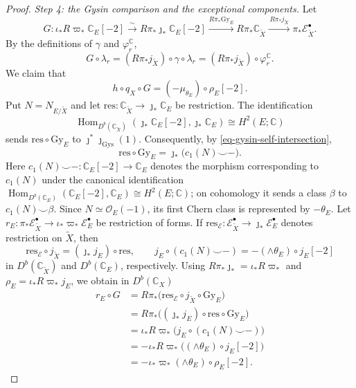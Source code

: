 \documentclass[11pt]{amsart}
\numberwithin{equation}{section}
\theoremstyle{plain}
\theoremstyle{definition}
\begin{document}
\begin{proof}
\smallskip
{}\label{step-generalized-bc-4}
\noindent\emph{Step 4: the Gysin comparison and the exceptional components.}
Let
\[
G:\iota_*R\varpi_*\mathbb C_E[-2]
\xrightarrow{\sim}R\pi_*\jmath_*\mathbb C_E[-2]
\xrightarrow{R\pi_*\mathrm{Gy}_E}R\pi_*\mathbb C_{\tilde{X}}
\xrightarrow{\,R\pi_*j_{\tilde X}\,}\pi_*\mathcal E_{\tilde{X}}^\bullet.
\]
By the definitions of $\gamma$ and $\varphi_r^{\mathbb C}$,
\[
G\circ\lambda_r
=(R\pi_*j_{\tilde X})\circ\gamma\circ\lambda_r
=(R\pi_*j_{\tilde X})\circ\varphi_r^{\mathbb C}.
\]
We claim that
\[
h\circ q_X\circ G=(-\mu_{\theta_E})\circ\rho_E[-2].
\]
Put $N=N_{E/\tilde{X}}$ and let
$\mathrm{res}:\mathbb C_{\tilde{X}}\to \jmath_*\mathbb C_E$ be restriction.
The identification
\[
\operatorname{Hom}_{D^b(\mathbb C_{\tilde{X}})}
 (\jmath_*\mathbb C_E[-2],\jmath_*\mathbb C_E)
\cong H^2(E;\mathbb C)
\]
sends $\mathrm{res}\circ\mathrm{Gy}_E$ to
$\jmath^*\jmath_{\mathrm{Gys}}(1)$. Consequently, by
\eqref{eq-gysin-self-intersection},
\[
\mathrm{res}\circ\mathrm{Gy}_E=\jmath_*\bigl(c_1(N)\smile-\bigr).
\]
Here $c_1(N)\smile-:\mathbb C_E[-2]\to\mathbb C_E$ denotes the
morphism corresponding to $c_1(N)$ under the canonical identification
$\operatorname{Hom}_{D^b(\mathbb C_E)}(\mathbb C_E[-2],\mathbb C_E)
\cong H^2(E;\mathbb C)$; on cohomology it sends a class $\beta$ to
$c_1(N)\smile\beta$.
Since $N\simeq\mathcal O_E(-1)$, its first Chern class is represented
by $-\theta_E$. Let
$r_E:\pi_*\mathcal E_{\tilde{X}}^\bullet\to \iota_*\varpi_*\mathcal E_E^\bullet$
be restriction of forms. If
$\mathrm{res}_{\mathcal E}:\mathcal E_{\tilde{X}}^\bullet
\to\jmath_*\mathcal E_E^\bullet$ denotes restriction on $\tilde{X}$, then
\[
\mathrm{res}_{\mathcal E}\circ j_{\tilde{X}}
=(\jmath_*j_E)\circ\mathrm{res},
\qquad
j_E\circ(c_1(N)\smile-)
=-(\wedge\theta_E)\circ j_E[-2]
\]
in $D^b(\mathbb C_{\tilde{X}})$ and $D^b(\mathbb C_E)$, respectively.
Using $R\pi_*\jmath_*=\iota_*R\varpi_*$ and
$\rho_E=\iota_*R\varpi_*j_E$, we obtain in $D^b(\mathbb C_X)$
\[
\begin{aligned}
r_E\circ G
&=R\pi_*\bigl(\mathrm{res}_{\mathcal E}\circ j_{\tilde{X}}
  \circ\mathrm{Gy}_E\bigr)\\
&=R\pi_*\bigl((\jmath_*j_E)\circ\mathrm{res}
  \circ\mathrm{Gy}_E\bigr)\\
&=\iota_*R\varpi_*\bigl(j_E\circ(c_1(N)\smile-)\bigr)\\
&=-\iota_*R\varpi_*\bigl((\wedge\theta_E)\circ j_E[-2]\bigr)\\
&=-\iota_*\varpi_*(\wedge\theta_E)\circ\rho_E[-2].
\end{aligned}
\]
\end{proof}
\end{document}
